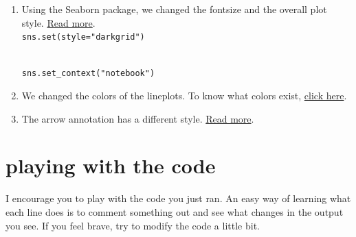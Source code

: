 \documentclass[
  letterpaper,
  DIV=11,
  numbers=noendperiod]{scrreprt}
\providecommand{\tightlist}{%
  \setlength{\itemsep}{0pt}\setlength{\parskip}{0pt}}\usepackage{longtable,booktabs,array}
\begin{document}
\begin{enumerate}
\def\labelenumi{\arabic{enumi}.}
\tightlist
\item
  Using the Seaborn package, we changed the fontsize and the overall
  plot style.
  \href{https://seaborn.pydata.org/tutorial/aesthetics.html}{Read
  more}.\\
  \texttt{sns.set(style="darkgrid")}\strut \\
  \texttt{sns.set\_context("notebook")}
\item
  We changed the colors of the lineplots. To know what colors exist,
  \href{https://matplotlib.org/stable/gallery/color/named_colors.html}{click
  here}.
\item
  The arrow annotation has a different style.
  \href{https://jakevdp.github.io/PythonDataScienceHandbook/04.09-text-and-annotation.html\#Arrows-and-Annotation}{Read
  more}.
\end{enumerate}

\section{playing with the code}\label{playing-with-the-code}

I encourage you to play with the code you just ran. An easy way of
learning what each line does is to comment something out and see what
changes in the output you see. If you feel brave, try to modify the code
a little bit.
\end{document}
